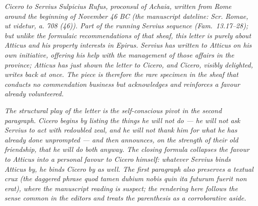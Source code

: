 
\textit{Cicero to Servius Sulpicius Rufus, proconsul of
Achaia, written from Rome around the beginning of November
46 BC (the manuscript dateline: \textit{Scr. Romae, ut
videtur, a. 708 (46)}). Part of the running Servius
sequence (Fam.\ 13.17--28); but unlike the formulaic
recommendations of that sheaf, this letter is purely
about Atticus and his property interests in Epirus.
Servius has written to Atticus on his own initiative,
offering his help with the management of those affairs in
the province; Atticus has just shown the letter to
Cicero, and Cicero, visibly delighted, writes back at
once. The piece is therefore the rare specimen in the
sheaf that conducts no commendation business but
acknowledges and reinforces a favour already volunteered.}

\textit{The structural play of the letter is the
self-conscious pivot in the second paragraph. Cicero
begins by listing the things he will not do --- he will
not ask Servius to act with redoubled zeal, and he will
not thank him for what he has already done unprompted ---
and then announces, on the strength of their old
friendship, that he will do both anyway. The closing
formula collapses the favour to Atticus into a personal
favour to Cicero himself: whatever Servius binds Atticus
by, he binds Cicero by as well. The first paragraph also
preserves a textual crux (the daggered phrase \textit{quod
tamen dubium nobis quin ita futurum fuerit non erat}),
where the manuscript reading is suspect; the rendering
here follows the sense common in the editors and treats
the parenthesis as a corroborative aside.}
